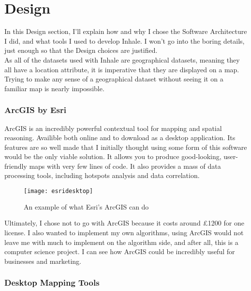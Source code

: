 \chapter{Design}
In this Design section, I'll explain how and why I chose the Software Architecture I did, and what tools I used to develop Inhale. I won't go into the boring details, just enough so that the Design choices are justified.\\

As all of the datasets used with Inhale are geographical datasets, meaning they all have a location attribute, it is imperative that they are displayed on a map. Trying to make any sense of a geographical dataset without seeing it on a familiar map is nearly impossible.\\

\subsection{ArcGIS by Esri}

ArcGIS is an incredibly powerful contextual tool for mapping and spatial reasoning. Availible both online and to download as a desktop application. Its features are so well made that I initially thought using some form of this software would be the only viable solution. It allows you to produce good-looking, user-friendly maps with very few lines of code. It  also provides a mass of data processing tools, including hotspots analysis and data correlation.\\

\begin{figure}[H]
\begin{center}
\texttt{[image: esridesktop]}
\label{fig:esri}
\caption{An example of what Esri's ArcGIS can do \cite{esridesktop}}
\end{center}
\end{figure}

Ultimately, I chose not to go with ArcGIS because it costs around \pounds1200 for one license. I also wanted to implement my own algorithms, using ArcGIS would not leave me with much to implement on the algorithm side, and after all, this is a computer science project. I can see how ArcGIS could be incredibly useful for businesses and marketing.

\subsection{Desktop Mapping Tools}

